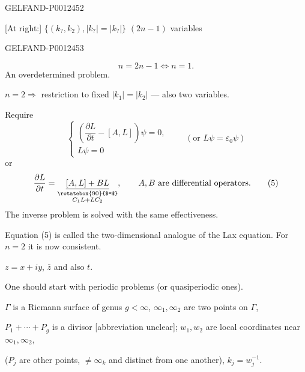 \begin{GelfandAdjacentEvidence}{GELFAND-P001245}{2}


[At right:] $\{(k_{?},k_2),\lvert k_{?}\rvert=\lvert k_{?}\rvert\}$ $(2n-1)$ variables
\end{GelfandAdjacentEvidence}
\begin{GelfandAdjacentEvidence}{GELFAND-P001245}{3}

\begin{equation*}
n=2n-1\Leftrightarrow n=1.
\end{equation*}
An overdetermined problem.

\underline{$n=2$}\quad $\Rightarrow$ restriction to fixed $\lvert k_1\rvert=\lvert k_2\rvert$ — also two variables.

Require
\begin{equation*}
\begin{cases}
\left(\dfrac{\partial L}{\partial t}-[A,L]\right)\psi=0,\\
L\psi=0
\end{cases}
\qquad(\text{or }L\psi=\varepsilon_0\psi)\tag{4}
\end{equation*}
or
\begin{equation*}
\frac{\partial L}{\partial t}=
\underset{\substack{\rotatebox{90}{$=$}\\ C_1L+LC_2}}{\underline{[A,L]+BL}},
\qquad A,B\text{ are differential operators}.\tag{5}
\end{equation*}
The inverse problem is solved with the same effectiveness.

Equation (5) is called the two-dimensional analogue of the Lax equation.
For $n=2$ it is now consistent.

$z=x+iy$, $\bar z$ and also $t$.

One should start with periodic problems (or quasiperiodic ones).

$\Gamma$ is a Riemann surface of genus $g<\infty$, $\infty_1,\infty_2$ are two points on $\Gamma$,

$P_1+\cdots+P_g$ is a divisor [abbreviation unclear];
$w_1,w_2$ are local coordinates near $\infty_1,\infty_2$,

($P_j$ are other points, $\ne\infty_k$ and distinct from one another), $k_j=w_j^{-1}$.
\end{GelfandAdjacentEvidence}



